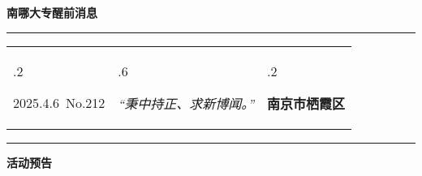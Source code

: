 \documentclass[letterpaper, 12pt]{article}
\begin{document}
\begin{center}
    \Huge\textbf{南哪大专醒前消息}
\end{center}
\vspace{4mm}
\hrule
\renewcommand\tabularxcolumn[1]{m{#1}}
\begin{tabularx}{\textwidth}{>{\hsize.2\hsize}X>{\hsize.6\hsize}X>{\hsize.2\hsize}X}
    \begin{flushleft}
        2025.4.6\, No.212
    \end{flushleft}
    &
    \begin{center}
        \textit{“秉中持正、求新博闻。”}
    \end{center}
    &
    \begin{flushright}
        \textbf{南京市栖霞区}
    \end{flushright}
\end{tabularx}
\vspace{-3.5mm}
\hrule
\vspace{4mm}
\centerline{\huge\textbf{活动预告}}
\end{document}
